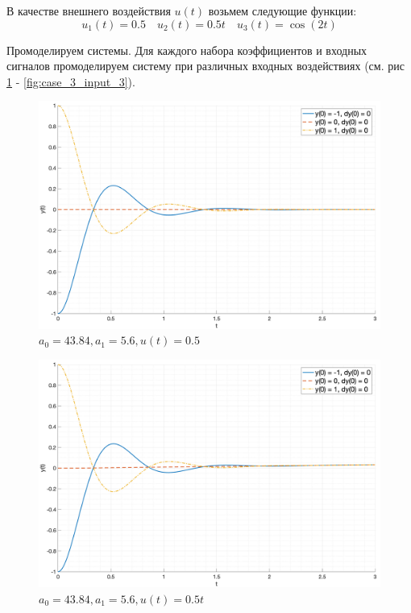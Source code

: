 В качестве внешнего воздействия $u(t)$ возьмем следующие функции:
\begin{equation}
    u_1(t) = 0.5\quad u_2(t) = 0.5t\quad u_3(t) = \cos(2t)
\end{equation}

Промоделируем системы. Для каждого набора коэффициентов и входных сигналов промоделируем 
систему при различных входных воздействиях (см. рис \ref{fig:case1_input1} - \ref{fig:case_3_input_3}).
\begin{figure}[ht!]
    \centering
    \includegraphics[width=\textwidth]{media/plots/case1_input1.png}
    \caption{$a_0 = 43.84, a_1 = 5.6, u(t) = 0.5$}
    \label{fig:case1_input1}
\end{figure}
\begin{figure}[ht!]
    \centering
    \includegraphics[width=\textwidth]{media/plots/case1_input2.png}
    \caption{$a_0 = 43.84, a_1 = 5.6, u(t) = 0.5t$}
    \label{fig:case1_input2}
\end{figure}
